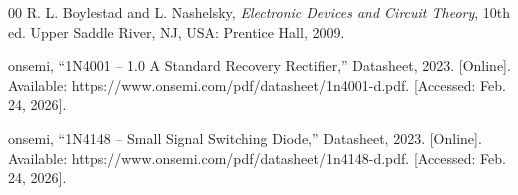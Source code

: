 \documentclass[journal]{IEEEtran}
\begin{document}

\printbibliography

\begin{thebibliography}{00}
R. L. Boylestad and L. Nashelsky, \textit{Electronic Devices and Circuit Theory}, 10th ed. Upper Saddle River, NJ, USA: Prentice Hall, 2009.

onsemi, ``1N4001 -- 1.0 A Standard Recovery Rectifier,'' Datasheet, 2023. [Online]. Available: https://www.onsemi.com/pdf/datasheet/1n4001-d.pdf. [Accessed: Feb. 24, 2026].

onsemi, ``1N4148 -- Small Signal Switching Diode,'' Datasheet, 2023. [Online]. Available: https://www.onsemi.com/pdf/datasheet/1n4148-d.pdf. [Accessed: Feb. 24, 2026].
\end{thebibliography}

\end{document}
